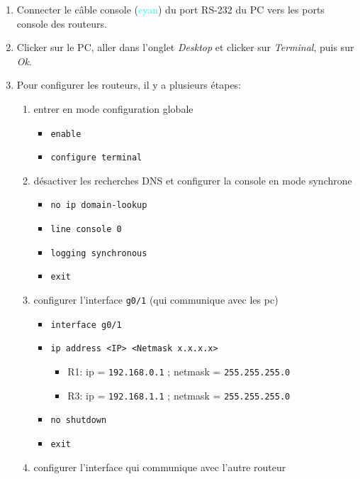 \documentclass[a4paper]{article}
\begin{document}
\begin{enumerate}
\item Connecter le câble console (\textcolor{cyan}{cyan}) du port RS-232 du PC vers les ports console des routeurs.
\item Clicker sur le PC, aller dans l'onglet \textit{Desktop} et clicker sur \textit{Terminal}, puis sur \textit{Ok}.
\item Pour configurer les routeurs, il y a plusieurs étapes:
\begin{enumerate}
    \item entrer en mode configuration globale
    \begin{itemize}
        \item \texttt{enable}
        \item \texttt{configure terminal}
    \end{itemize}
    \item désactiver les recherches DNS et configurer la console en mode synchrone
    \begin{itemize}
        \item \texttt{no ip domain-lookup}
        \item \texttt{line console 0}
        \item \texttt{logging synchronous}
        \item \texttt{exit}
    \end{itemize}
    \item configurer l'interface \texttt{g0/1} (qui communique avec les pc)
    \begin{itemize}
        \item \texttt{interface g0/1}
        \item \texttt{ip address <IP> <Netmask x.x.x.x>}
        \begin{example}
            \begin{itemize}
                \item R1: ip = \texttt{192.168.0.1} \; ; \; netmask = \texttt{255.255.255.0}
                \item R3: ip = \texttt{192.168.1.1} \; ; \; netmask = \texttt{255.255.255.0}
            \end{itemize}
        \end{example}
        \item \texttt{no shutdown}
        \item \texttt{exit}
    \end{itemize}
    \item configurer l'interface qui communique avec l'autre routeur
    \begin{itemize}

\end{itemize}
\end{enumerate}
\end{enumerate}
\end{document}
